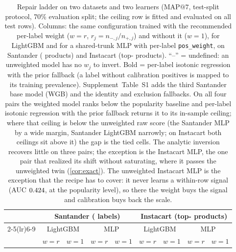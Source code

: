 \documentclass[sigconf,nonacm]{acmart}
\makeatletter
\newcommand{\mapseven}{\mathrm{MAP}@7\xspace}
\newcommand{\Supp}[1]{Supplement~#1}  %
\makeatother
\begin{document}
\begin{table}[t]
\caption{Repair ladder on two datasets and two learners ($\mapseven$, test-split protocol, 70\% evaluation split; the ceiling row is fitted and evaluated on all test rows). Columns: the same configuration trained with the recommended per-label weight ($w{=}r$, $r_j=n_{-,j}/n_{+,j}$) and without it ($w{=}1$), for LightGBM and for a shared-trunk MLP with per-label \texttt{pos\_weight}, on Santander (\nnLabels{} products) and Instacart (top-\nInLabels{} products). ``--'' = undefined: an unweighted model has no $w_j$ to invert. Bold = per-label isotonic regression with the prior fallback (a label without calibration positives is mapped to its training prevalence). \Supp{Table~S1} adds the third Santander base model (WGB) and the identity and exclusion fallbacks. On all four pairs the weighted model ranks below the popularity baseline and per-label isotonic regression with the prior fallback returns it to its in-sample ceiling; where that ceiling is below the unweighted raw score (the Santander MLP by a wide margin, Santander LightGBM narrowly; on Instacart both ceilings sit above it) the gap is the tied cells. The analytic inversion recovers little on three pairs; the exception is the Instacart MLP, the one pair that realized its shift without saturating, where it passes the unweighted twin (\cref{cor:exact}). The unweighted Instacart MLP is the exception that the recipe has to cover: it never learns a within-row signal (AUC $0.424$, at the popularity level), so there the weight buys the signal and calibration buys back the scale.}
\label{tab:ladder}
\footnotesize
\setlength{\tabcolsep}{4pt}
\begin{tabular}{@{}lcccccccc@{}}
\toprule
 & \multicolumn{4}{c}{Santander (\nnLabels{} labels)} & \multicolumn{4}{c}{Instacart (top-\nInLabels{} products)} \\
\cmidrule(lr){2-5}\cmidrule(lr){6-9}
 & \multicolumn{2}{c}{LightGBM} & \multicolumn{2}{c}{MLP} & \multicolumn{2}{c}{LightGBM} & \multicolumn{2}{c}{MLP} \\
 & $w{=}r$ & $w{=}1$ & $w{=}r$ & $w{=}1$ & $w{=}r$ & $w{=}1$ & $w{=}r$ & $w{=}1$ \\
\midrule

\bottomrule
\end{tabular}
\end{table}
\end{document}
